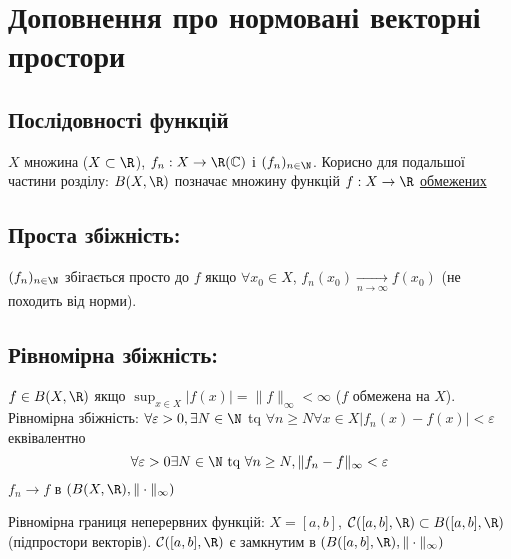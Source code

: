 \section{Доповнення про нормовані векторні простори}
\subsection{Послідовності функцій}
$X$ множина ($X \subset \R$), $f_n: X \to \R(\mathbb{C})$ і $(f_n)_{n \in \N}$. Корисно для подальшої частини розділу: $B(X, \R)$ позначає множину функцій $f: X \to \R$ \underline{обмежених}
\subsection{Проста збіжність: }
\begin{definition}
    $(f_n)_{n \in \N}$ збігається просто до $f$ якщо $\forall x_0 \in X$, $f_n(x_0) \xrightarrow[n \to \infty]{} f(x_0)$ (не походить від норми).
\end{definition}
\subsection{Рівномірна збіжність: }
\begin{definition}
    $f \in B(X, \R)$ якщо $\sup_{x \in X} |f(x)| = \|f\|_{\infty} < \infty$ ($f$ обмежена на $X$). \\
    Рівномірна збіжність: $\forall \varepsilon > 0, \exists N \in \N$ tq $\forall n \ge N \forall x \in X |f_n(x) - f(x)| < \varepsilon$ еквівалентно
    \[
    \forall \varepsilon > 0 \exists N \in \N \text{ tq } \forall n \ge N, \|f_n - f\|_{\infty} < \varepsilon
    \] 
    $f_n \to f$ в $(B(X, \R), \| \cdot \|_{\infty})$
\end{definition}
\begin{definition}
    Рівномірна границя неперервних функцій: $X = [a, b]$, $\mathcal{C}([a, b], \R) \subset B([a, b], \R)$(підпростори векторів). $\mathcal{C}([a, b], \R)$ є замкнутим в $(B([a, b], \R), \| \cdot \|_{\infty})$
\end{definition}
